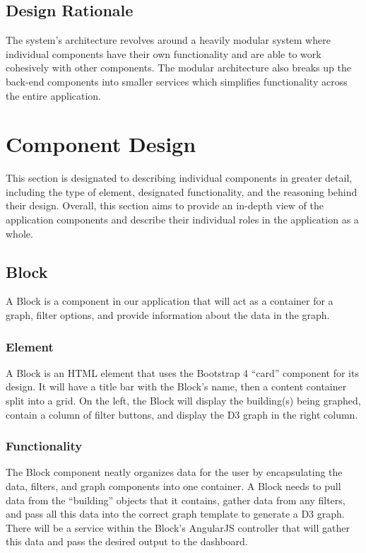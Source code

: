 \documentclass[journal,10pt,onecolumn,compsoc]{IEEEtran}
\begin{document}
    \subsection{Design Rationale}
    The system's architecture revolves around a heavily modular system where individual components have their own functionality and are able to work cohesively with other components. The modular architecture also breaks up the back-end components into smaller services which simplifies functionality across the entire application.
    
    \section{Component Design}
    This section is designated to describing individual components in greater detail, including the type of element, designated functionality, and the reasoning behind their design. 
	Overall, this section aims to provide an in-depth view of the application components and describe their individual roles in the application as a whole.
		\subsection{Block}
			A Block is a component in our application that will act as a container for a graph, filter options, and provide information about the data in the graph.
			\subsubsection{Element} 
				A Block is an HTML element that uses the Bootstrap 4 ``card'' component for its design. It will have a title bar with the Block's name, then a content container split into a grid. 
				On the left, the Block will display the building(s) being graphed, contain a column of filter buttons, and display the D3 graph in the right column. 
			\subsubsection{Functionality}
				The Block component neatly organizes data for the user by encapsulating the data, filters, and graph components into one container. 
				A Block needs to pull data from the ``building'' objects that it contains, gather data from any filters, and pass all this data into the correct graph template to generate a D3 graph. 
				There will be a service within the Block's AngularJS controller that will gather this data and pass the desired output to the dashboard.
\end{document}
